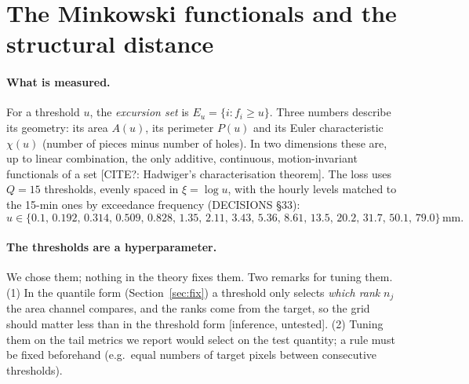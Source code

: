\documentclass[11pt,a4paper]{article}
\newcommand{\citeq}[1]{\textcolor{red!70!black}{[CITE?: #1]}}
\newcommand{\status}[1]{\textsf{\small[#1]}}
\begin{document}
\section{The Minkowski functionals and the structural distance}\label{sec:mink}

\paragraph{What is measured.} For a threshold $u$, the \emph{excursion set} is $E_u = \{i : f_i \ge u\}$. Three numbers
describe its geometry: its area $A(u)$, its perimeter $P(u)$ and its Euler characteristic $\chi(u)$ (number of pieces
minus number of holes). In two dimensions these are, up to linear combination, the only additive, continuous,
motion-invariant functionals of a set \citeq{Hadwiger's characterisation theorem}. The loss uses $Q = 15$ thresholds,
evenly spaced in $\xi = \log u$, with the hourly levels matched to the 15-min ones by exceedance frequency
(DECISIONS \S33):
\[
u \in \{0.1,\, 0.192,\, 0.314,\, 0.509,\, 0.828,\, 1.35,\, 2.11,\, 3.43,\, 5.36,\, 8.61,\, 13.5,\, 20.2,\, 31.7,\, 50.1,\, 79.0\}\,\text{mm}.
\]

\paragraph{The thresholds are a hyperparameter.} We chose them; nothing in the theory fixes them. Two remarks for
tuning them. (1) In the quantile form (Section~\ref{sec:fix}) a threshold only selects \emph{which rank} $n_j$ the area
channel compares, and the ranks come from the target, so the grid should matter less than in the threshold form
\status{inference, untested}. (2) Tuning them on the tail metrics we report would select on the test quantity; a rule
must be fixed beforehand (e.g.\ equal numbers of target pixels between consecutive thresholds).
\end{document}
